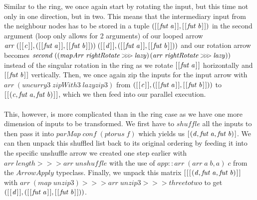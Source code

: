 \documentclass{jfp1}
\newcommand{\Conid}[1]{\mathit{#1}}
\newcommand{\Varid}[1]{\mathit{#1}}
\begin{document}
Similar to the ring, we once again start by rotating the input, but this time not only in one direction, but in two. This means that the intermediary input from the neighbour nodes has to be stored in a tuple \ensuremath{([\mskip1.5mu [\mskip1.5mu \Varid{fut}\;\Varid{a}\mskip1.5mu]\mskip1.5mu],[\mskip1.5mu [\mskip1.5mu \Varid{fut}\;\Varid{b}\mskip1.5mu]\mskip1.5mu])} in the second argument (loop only allows for 2 arguments) of our looped arrow \ensuremath{\Varid{arr}\;([\mskip1.5mu [\mskip1.5mu \Varid{c}\mskip1.5mu]\mskip1.5mu],([\mskip1.5mu [\mskip1.5mu \Varid{fut}\;\Varid{a}\mskip1.5mu]\mskip1.5mu],[\mskip1.5mu [\mskip1.5mu \Varid{fut}\;\Varid{b}\mskip1.5mu]\mskip1.5mu]))\;([\mskip1.5mu [\mskip1.5mu \Varid{d}\mskip1.5mu]\mskip1.5mu],([\mskip1.5mu [\mskip1.5mu \Varid{fut}\;\Varid{a}\mskip1.5mu]\mskip1.5mu],[\mskip1.5mu [\mskip1.5mu \Varid{fut}\;\Varid{b}\mskip1.5mu]\mskip1.5mu]))} and our rotation arrow becomes \ensuremath{\Varid{second}\;((\Varid{mapArr}\;\Varid{rightRotate}\mathbin{>\!\!>\!\!>}\Varid{lazy})\mathbin{\*\!\*\!\*}(\Varid{arr}\;\Varid{rightRotate}\mathbin{>\!\!>\!\!>}\Varid{lazy}))} instead of the singular rotation in the ring as we rotate \ensuremath{[\mskip1.5mu [\mskip1.5mu \Varid{fut}\;\Varid{a}\mskip1.5mu]\mskip1.5mu]} horizontally and \ensuremath{[\mskip1.5mu [\mskip1.5mu \Varid{fut}\;\Varid{b}\mskip1.5mu]\mskip1.5mu]} vertically. Then, we once again zip the inputs for the input arrow with \ensuremath{\Varid{arr}\;(\Varid{uncurry3}\;\Varid{zipWith3}\;\Varid{lazyzip3})} from \ensuremath{([\mskip1.5mu [\mskip1.5mu \Varid{c}\mskip1.5mu]\mskip1.5mu],([\mskip1.5mu [\mskip1.5mu \Varid{fut}\;\Varid{a}\mskip1.5mu]\mskip1.5mu],[\mskip1.5mu [\mskip1.5mu \Varid{fut}\;\Varid{b}\mskip1.5mu]\mskip1.5mu]))} to \ensuremath{[\mskip1.5mu [\mskip1.5mu (\Varid{c},\Varid{fut}\;\Varid{a},\Varid{fut}\;\Varid{b})\mskip1.5mu]\mskip1.5mu]}, which we then feed into our parallel execution.
\\\\
This, however, is more complicated than in the ring case as we have one more dimension of inputs to be transformed. We first have to \ensuremath{\Varid{shuffle}} all the inputs to then pass it into \ensuremath{\Varid{parMap}\;\Varid{conf}\;(\Varid{ptorus}\;\Varid{f})} which yields us \ensuremath{[\mskip1.5mu (\Varid{d},\Varid{fut}\;\Varid{a},\Varid{fut}\;\Varid{b})\mskip1.5mu]}. We can then unpack this shuffled list back to its original ordering by feeding it into the specific unshuffle arrow we created one step earlier with \ensuremath{\Varid{arr}\;\Varid{length}\mathbin{>\!\!>\!\!>}\Varid{arr}\;\Varid{unshuffle}} with the use of \ensuremath{\Varid{app}\mathbin{::}\Varid{arr}\;(\Varid{arr}\;\Varid{a}\;\Varid{b},\Varid{a})\;\Varid{c}} from the \ensuremath{\Conid{ArrowApply}} typeclass. Finally, we unpack this matrix \ensuremath{[\mskip1.5mu [\mskip1.5mu [\mskip1.5mu (\Varid{d},\Varid{fut}\;\Varid{a},\Varid{fut}\;\Varid{b})\mskip1.5mu]\mskip1.5mu]} with \ensuremath{\Varid{arr}\;(\Varid{map}\;\Varid{unzip3})\mathbin{>\!\!>\!\!>}\Varid{arr}\;\Varid{unzip3}\mathbin{>\!\!>\!\!>}\Varid{threetotwo}} to get  \ensuremath{([\mskip1.5mu [\mskip1.5mu \Varid{d}\mskip1.5mu]\mskip1.5mu],([\mskip1.5mu [\mskip1.5mu \Varid{fut}\;\Varid{a}\mskip1.5mu]\mskip1.5mu],[\mskip1.5mu [\mskip1.5mu \Varid{fut}\;\Varid{b}\mskip1.5mu]\mskip1.5mu]))}.
\end{document}
